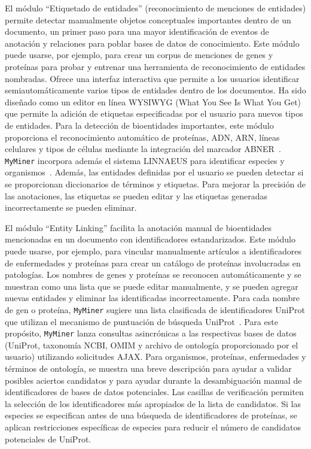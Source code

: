 El módulo ``Etiquetado de entidades'' (reconocimiento de menciones de entidades) permite detectar manualmente objetos conceptuales importantes dentro de un documento, un primer paso para una mayor identificación de eventos de anotación y relaciones para poblar bases de datos de conocimiento.
Este módulo puede usarse, por ejemplo, para crear un corpus de menciones de genes y proteínas para probar y entrenar una herramienta de reconocimiento de entidades nombradas.
Ofrece una interfaz interactiva que permite a los usuarios identificar semiautomáticamente varios tipos de entidades dentro de los documentos.
Ha sido diseñado como un editor en línea WYSIWYG (What You See Is What You Get) que permite la adición de etiquetas especificadas por el usuario para nuevos tipos de entidades.
Para la detección de bioentidades importantes, este módulo proporciona el reconocimiento automático de proteínas, ADN, ARN, líneas celulares y tipos de células mediante la integración del marcador ABNER~\cite{settles2005abner}.
\texttt{MyMiner} incorpora además el sistema LINNAEUS para identificar especies y organismos~\cite{gerner2010linnaeus}.
Además, las entidades definidas por el usuario se pueden detectar si se proporcionan diccionarios de términos y etiquetas.
Para mejorar la precisión de las anotaciones, las etiquetas se pueden editar y las etiquetas generadas incorrectamente se pueden eliminar.

El módulo ``Entity Linking'' facilita la anotación manual de bioentidades mencionadas en un documento con identificadores estandarizados.
Este módulo puede usarse, por ejemplo, para vincular manualmente artículos a identificadores de enfermedades y proteínas para crear un catálogo de proteínas involucradas en patologías.
Los nombres de genes y proteínas se reconocen automáticamente y se muestran como una lista que se puede editar manualmente, y se pueden agregar nuevas entidades y eliminar las identificadas incorrectamente.
Para cada nombre de gen o proteína, \texttt{MyMiner} sugiere una lista clasificada de identificadores UniProt que utilizan el mecanismo de puntuación de búsqueda UniProt~\cite{arighi2011overview}.
Para este propósito, \texttt{MyMiner} lanza consultas asincrónicas a las respectivas bases de datos (UniProt, taxonomía NCBI, OMIM y archivo de ontología proporcionado por el usuario) utilizando solicitudes AJAX.
Para organismos, proteínas, enfermedades y términos de ontología, se muestra una breve descripción para ayudar a validar posibles aciertos candidatos y para ayudar durante la desambiguación manual de identificadores de bases de datos potenciales.
Las casillas de verificación permiten la selección de los identificadores más apropiados de la lista de candidatos.
Si las especies se especifican antes de una búsqueda de identificadores de proteínas, se aplican restricciones específicas de especies para reducir el número de candidatos potenciales de UniProt.


